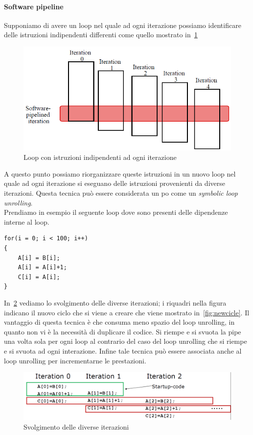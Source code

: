 \paragraph{Software pipeline}
Supponiamo di avere un loop nel quale ad ogni iterazione possiamo identificare delle istruzioni indipendenti differenti come quello mostrato in \figurename\,\ref{fig:swpipe}
\begin{figure}[htb]
\centering
\includegraphics[scale=0.5]{img/swpipe.png}
\caption{Loop con istruzioni indipendenti ad ogni iterazione}\label{fig:swpipe}
\end{figure}
A questo punto possiamo riorganizzare queste istruzioni in un nuovo loop nel quale ad ogni iterazione si eseguano delle istruzioni provenienti da diverse iterazioni.
Questa tecnica può essere considerata un po come un \emph{symbolic loop unrolling}.\\
Prendiamo in esempio il seguente loop dove sono presenti delle dipendenze interne al loop.
\begin{verbatim}
for(i = 0; i < 100; i++)
{
    A[i] = B[i];
    A[i] = A[i]+1;
    C[i] = A[i];
}
\end{verbatim}
In \figurename\,\ref{fig:iteration} vediamo lo svolgimento delle diverse iterazioni; i riquadri nella figura indicano il nuovo ciclo che si viene a creare che viene mostrato in \figurename\,\ref{fig:newcicle}. Il vantaggio di questa tecnica è che consuma meno spazio del loop unrolling, in quanto non vi è la necessità di duplicare il codice. Si riempe e si svuota la pipe una volta sola per ogni loop al contrario del caso del loop unrolling che si riempe e si svuota ad ogni interazione. Infine tale tecnica può essere associata anche al loop unrolling per incrementarne le prestazioni.
\begin{figure}[htb]
\centering
\includegraphics[scale=0.4]{img/iteration.png}
\caption{Svolgimento delle diverse iterazioni}\label{fig:iteration}
\end{figure}
